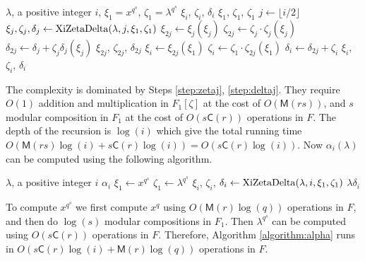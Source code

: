 \documentclass[12pt]{article}
\theoremstyle{plain}
\theoremstyle{definition}
\def\MM{\ensuremath{\mathsf{M}}}
\def\CC{\ensuremath{\mathsf{C}}}
\newcounter{algorithm}
\begin{document}
\begin{algorithm}
	\label{algorithm:xizetadelta}
	\begin{algorithmic}[1]
		\REQUIRE $\lambda$, a positive integer $i$, $\xi_1=x^{q^s}$, $\zeta_1=\lambda^{q^s}$
		\ENSURE $\xi_i$, $\zeta_i$, $\delta_i$
		\RETURN $\xi_1$, $\zeta_1$, $\zeta_1$
		\ENDIF
		\STATE $j \leftarrow \lfloor i/2\rfloor$
		\STATE $\xi_{j},\zeta_{j},\delta_j \leftarrow {\rm XiZetaDelta}(\lambda,j,\xi_1,\zeta_1)$ 
		\STATE $\xi_{2j} \leftarrow \xi_j(\xi_j)$
		\STATE\label{step:zetaj} $\zeta_{2j} \leftarrow \zeta_j\cdot \zeta_j(\xi_j)$
		\STATE\label{step:deltaj} $\delta_{2j}\leftarrow \delta_j+\zeta_j \delta_j(\xi_j)$
		\RETURN $\xi_{2j}$, $\zeta_{2j}$, $\delta_{2j}$
		\ENDIF
		\STATE $\xi_i \leftarrow \xi_{2j}(\xi_1)$
		\STATE $\zeta_i \leftarrow \zeta_1\cdot \zeta_{2j}(\xi_1)$
		\STATE $\delta_i \leftarrow \delta_{2j}+\zeta_i$
		\RETURN $\xi_i$, $\zeta_i$, $\delta_i$
	\end{algorithmic}
\end{algorithm}
The complexity is dominated by Steps \ref{step:zetaj}, \ref{step:deltaj}. They require $O(1)$ 
addition and multiplication in $F_1[\zeta]$ at the cost of $O(\MM(rs))$, and $s$ modular 
composition in $F_1$ at the cost of $O(s\CC(r))$ operations in $F$. The depth of the recursion is 
$\log(i)$ which give the total running time $O(\MM(rs)\log(i) + s\CC(r)\log(i)) = 
O(s\CC(r)\log(i))$. Now $\alpha_i(\lambda)$ can be computed using the following algorithm.

\begin{algorithm}
	\label{algorithm:alpha}
	\begin{algorithmic}[1]
		\REQUIRE $\lambda$, a positive integer $i$
		\ENSURE $\alpha_i$
		\STATE $\xi_1 \leftarrow x^{q^s}$
		\STATE $\zeta_1 \leftarrow \lambda^{q^s}$
		\STATE $\xi_i$, $\zeta_i$, $\delta_i \leftarrow {\rm XiZetaDelta}(\lambda,i,\xi_1,\zeta_1)$ 
		\RETURN $\lambda \delta_i$
	\end{algorithmic}
\end{algorithm}
To compute $x^{q^s}$ we first compute $x^q$ using $O(\MM(r)\log(q))$ operations in $F$, and then do 
$\log(s)$ modular compositions in $F_1$. Then $\lambda^{q^s}$ can be computed using $O(s\CC(r))$ 
operations in $F$. Therefore, Algorithm \ref{algorithm:alpha} runs in $O(s\CC(r)\log(i) + 
\MM(r)\log(q))$ operations in $F$.
\end{document}
